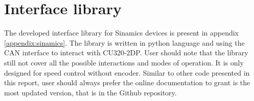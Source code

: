 \section{Interface library}

The developed interface library for Sinamics devices is present in appendix \ref{appendix:sinamics}. The library is written in python language and using the CAN interface to interact with CU320-2DP. User should note that the library still not cover all the possible interactions and modes of operation. It is only designed for speed control without encoder. Similar to other code presented in this report, user should always prefer the online documentation to grant is the most updated version, that is in the Github repository.